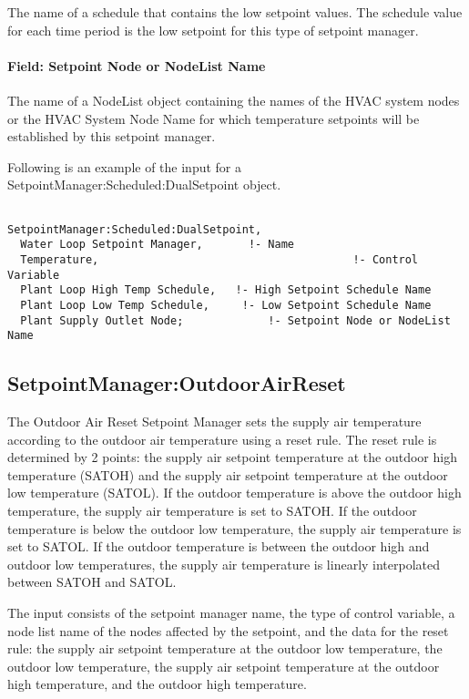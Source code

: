 The name of a schedule that contains the low setpoint values. The schedule value for each time period is the low setpoint for this type of setpoint manager.

\paragraph{Field: Setpoint Node or NodeList Name}\label{field-setpoint-node-or-nodelist-name-1}

The name of a NodeList object containing the names of the HVAC system nodes or the HVAC System Node Name for which temperature setpoints will be established by this setpoint manager.

Following is an example of the input for a SetpointManager:Scheduled:DualSetpoint object.

\begin{lstlisting}

SetpointManager:Scheduled:DualSetpoint,
  Water Loop Setpoint Manager,       !- Name
  Temperature,                                       !- Control Variable
  Plant Loop High Temp Schedule,   !- High Setpoint Schedule Name
  Plant Loop Low Temp Schedule,     !- Low Setpoint Schedule Name
  Plant Supply Outlet Node;             !- Setpoint Node or NodeList Name
\end{lstlisting}

\subsection{SetpointManager:OutdoorAirReset}\label{setpointmanageroutdoorairreset}

The Outdoor Air Reset Setpoint Manager sets the supply air temperature according to the outdoor air temperature using a reset rule. The reset rule is determined by 2 points: the supply air setpoint temperature at the outdoor high temperature (SATOH) and the supply air setpoint temperature at the outdoor low temperature (SATOL). If the outdoor temperature is above the outdoor high temperature, the supply air temperature is set to SATOH. If the outdoor temperature is below the outdoor low temperature, the supply air temperature is set to SATOL. If the outdoor temperature is between the outdoor high and outdoor low temperatures, the supply air temperature is linearly interpolated between SATOH and SATOL.

The input consists of the setpoint manager name, the type of control variable, a node list name of the nodes affected by the setpoint, and the data for the reset rule: the supply air setpoint temperature at the outdoor low temperature, the outdoor low temperature, the supply air setpoint temperature at the outdoor high temperature, and the outdoor high temperature.

